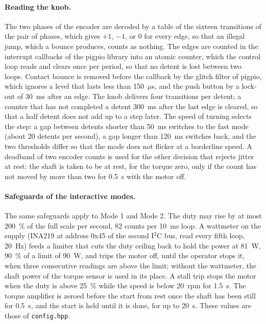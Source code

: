 \paragraph{Reading the knob.}
The two phases of the encoder are decoded by a table of the sixteen transitions of the pair of phases, which gives $+1$, $-1$, or 0 for every edge, so that an illegal jump, which a bounce produces, counts as nothing. The edges are counted in the interrupt callbacks of the pigpio library into an atomic counter, which the control loop reads and clears once per period, so that no detent is lost between two loops. Contact bounce is removed before the callback by the glitch filter of pigpio, which ignores a level that lasts less than 150~$\mu$s, and the push button by a lock-out of 30~ms after an edge. The knob delivers four transitions per detent; a counter that has not completed a detent 300~ms after the last edge is cleared, so that a half detent does not add up to a step later. The speed of turning selects the step: a gap between detents shorter than 50~ms switches to the fast mode (about 20 detents per second), a gap longer than 120~ms switches back, and the two thresholds differ so that the mode does not flicker at a borderline speed. A deadband of two encoder counts is used for the other decision that rejects jitter at rest: the shaft is taken to be at rest, for the torque zero, only if the count has not moved by more than two for 0.5~s with the motor off.

\paragraph{Safeguards of the interactive modes.}
The same safeguards apply to Mode 1 and Mode 2. The duty may rise by at most 200~\% of the full scale per second, 82 counts per 10~ms loop. A wattmeter on the supply (INA219 at address 0x45 of the second I$^2$C bus, read every fifth loop, 20~Hz) feeds a limiter that cuts the duty ceiling back to hold the power at 81~W, 90~\% of a limit of 90~W, and trips the motor off, until the operator stops it, when three consecutive readings are above the limit; without the wattmeter, the shaft power of the torque sensor is used in its place. A stall trip stops the motor when the duty is above 25~\% while the speed is below 20~rpm for 1.5~s. The torque amplifier is zeroed before the start from rest once the shaft has been still for 0.5~s, and the start is held until it is done, for up to 20~s. These values are those of \texttt{config.hpp}. %

